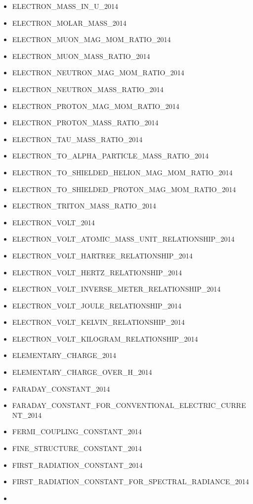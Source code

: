 \begin{itemize}
  ELECTRON\_MASS\_ENERGY\_EQUIVALENT\_IN\_MEV\_2014
\item
  ELECTRON\_MASS\_IN\_U\_2014
\item
  ELECTRON\_MOLAR\_MASS\_2014
\item
  ELECTRON\_MUON\_MAG\_MOM\_RATIO\_2014
\item
  ELECTRON\_MUON\_MASS\_RATIO\_2014
\item
  ELECTRON\_NEUTRON\_MAG\_MOM\_RATIO\_2014
\item
  ELECTRON\_NEUTRON\_MASS\_RATIO\_2014
\item
  ELECTRON\_PROTON\_MAG\_MOM\_RATIO\_2014
\item
  ELECTRON\_PROTON\_MASS\_RATIO\_2014
\item
  ELECTRON\_TAU\_MASS\_RATIO\_2014
\item
  ELECTRON\_TO\_ALPHA\_PARTICLE\_MASS\_RATIO\_2014
\item
  ELECTRON\_TO\_SHIELDED\_HELION\_MAG\_MOM\_RATIO\_2014
\item
  ELECTRON\_TO\_SHIELDED\_PROTON\_MAG\_MOM\_RATIO\_2014
\item
  ELECTRON\_TRITON\_MASS\_RATIO\_2014
\item
  ELECTRON\_VOLT\_2014
\item
  ELECTRON\_VOLT\_ATOMIC\_MASS\_UNIT\_RELATIONSHIP\_2014
\item
  ELECTRON\_VOLT\_HARTREE\_RELATIONSHIP\_2014
\item
  ELECTRON\_VOLT\_HERTZ\_RELATIONSHIP\_2014
\item
  ELECTRON\_VOLT\_INVERSE\_METER\_RELATIONSHIP\_2014
\item
  ELECTRON\_VOLT\_JOULE\_RELATIONSHIP\_2014
\item
  ELECTRON\_VOLT\_KELVIN\_RELATIONSHIP\_2014
\item
  ELECTRON\_VOLT\_KILOGRAM\_RELATIONSHIP\_2014
\item
  ELEMENTARY\_CHARGE\_2014
\item
  ELEMENTARY\_CHARGE\_OVER\_H\_2014
\item
  FARADAY\_CONSTANT\_2014
\item
  FARADAY\_CONSTANT\_FOR\_CONVENTIONAL\_ELECTRIC\_CURRENT\_2014
\item
  FERMI\_COUPLING\_CONSTANT\_2014
\item
  FINE\_STRUCTURE\_CONSTANT\_2014
\item
  FIRST\_RADIATION\_CONSTANT\_2014
\item
  FIRST\_RADIATION\_CONSTANT\_FOR\_SPECTRAL\_RADIANCE\_2014
\item

\end{itemize}
